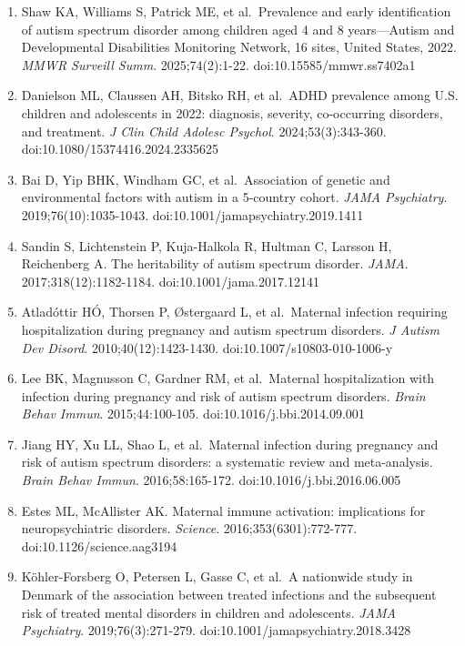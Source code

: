 \documentclass[11pt]{article}
\providecommand{\tightlist}{\setlength{\itemsep}{0pt}\setlength{\parskip}{0pt}}
\begin{document}
{\small{}\begin{enumerate}
\def\labelenumi{\arabic{enumi}.}
\tightlist
\item
  Shaw KA, Williams S, Patrick ME, et al.~Prevalence and early identification of autism spectrum disorder among children aged 4 and 8 years---Autism and Developmental Disabilities Monitoring Network,
  16 sites, United States, 2022. \emph{MMWR Surveill Summ}. 2025;74(2):1-22. doi:10.15585/mmwr.ss7402a1
\item
  Danielson ML, Claussen AH, Bitsko RH, et al.~ADHD prevalence among U.S. children and adolescents in 2022: diagnosis, severity, co-occurring disorders, and treatment. \emph{J Clin Child Adolesc
  Psychol}. 2024;53(3):343-360. doi:10.1080/15374416.2024.2335625
\item
  Bai D, Yip BHK, Windham GC, et al.~Association of genetic and environmental factors with autism in a 5-country cohort. \emph{JAMA Psychiatry}. 2019;76(10):1035-1043.
  doi:10.1001/jamapsychiatry.2019.1411
\item
  Sandin S, Lichtenstein P, Kuja-Halkola R, Hultman C, Larsson H, Reichenberg A. The heritability of autism spectrum disorder. \emph{JAMA}. 2017;318(12):1182-1184. doi:10.1001/jama.2017.12141
\item
  Atladóttir HÓ, Thorsen P, Østergaard L, et al.~Maternal infection requiring hospitalization during pregnancy and autism spectrum disorders. \emph{J Autism Dev Disord}. 2010;40(12):1423-1430.
  doi:10.1007/s10803-010-1006-y
\item
  Lee BK, Magnusson C, Gardner RM, et al.~Maternal hospitalization with infection during pregnancy and risk of autism spectrum disorders. \emph{Brain Behav Immun}. 2015;44:100-105.
  doi:10.1016/j.bbi.2014.09.001
\item
  Jiang HY, Xu LL, Shao L, et al.~Maternal infection during pregnancy and risk of autism spectrum disorders: a systematic review and meta-analysis. \emph{Brain Behav Immun}. 2016;58:165-172.
  doi:10.1016/j.bbi.2016.06.005
\item
  Estes ML, McAllister AK. Maternal immune activation: implications for neuropsychiatric disorders. \emph{Science}. 2016;353(6301):772-777. doi:10.1126/science.aag3194
\item
  Köhler-Forsberg O, Petersen L, Gasse C, et al.~A nationwide study in Denmark of the association between treated infections and the subsequent risk of treated mental disorders in children and
  adolescents. \emph{JAMA Psychiatry}. 2019;76(3):271-279. doi:10.1001/jamapsychiatry.2018.3428

\end{enumerate}}
\end{document}

